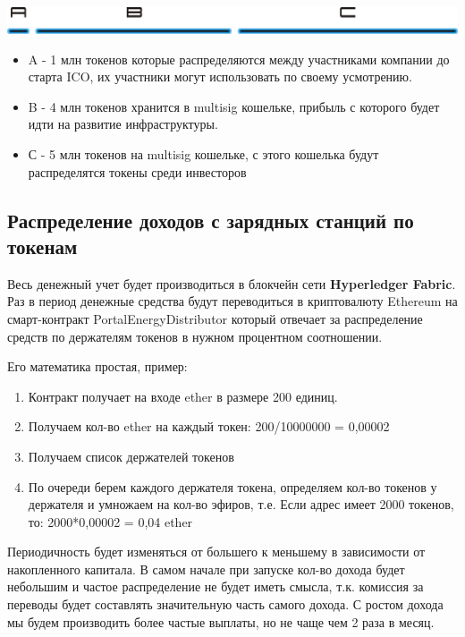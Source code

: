 \documentclass[a4paper,12pt]{report}
\begin{document}
\vspace*{0.5cm}
\includegraphics[width=13.6cm]{token-separate}
\vspace*{0.5cm}

\begin{itemize}
	\item A - 1 млн токенов которые распределяются между участниками компании до старта ICO, их участники могут использовать по своему усмотрению.
	\item B - 4 млн токенов хранится в multisig кошельке, прибыль с которого будет идти на развитие инфраструктуры.
	\item С - 5 млн токенов на multisig кошельке, с этого кошелька будут распределятся токены среди инвесторов 
\end{itemize}

\subsection{Распределение доходов с зарядных станций по токенам}
\label{capital}
Весь денежный учет будет производиться в блокчейн сети \textbf{Hyperledger Fabric}. 
Раз в период денежные средства будут переводиться в криптовалюту Ethereum на смарт-контракт PortalEnergyDistributor который отвечает за распределение средств по держателям токенов в нужном процентном соотношении.

Его математика простая, пример:

\begin{enumerate}
	\item Контракт получает на входе ether в размере 200 единиц.
	\item Получаем кол-во ether на каждый токен: 200/10000000 = 0,00002
	\item Получаем список держателей токенов
	\item По очереди берем каждого держателя токена, определяем кол-во токенов у держателя и умножаем на кол-во эфиров, т.е. Если адрес имеет 2000 токенов, то: 2000*0,00002 = 0,04 ether
\end{enumerate}

Периодичность будет изменяться от большего к меньшему в зависимости от накопленного капитала. В самом начале при запуске кол-во дохода будет небольшим и частое распределение не будет иметь смысла, т.к. комиссия за переводы будет составлять значительную часть самого дохода. С ростом дохода мы будем производить более частые выплаты, но не чаще чем 2 раза в месяц.
\end{document}
